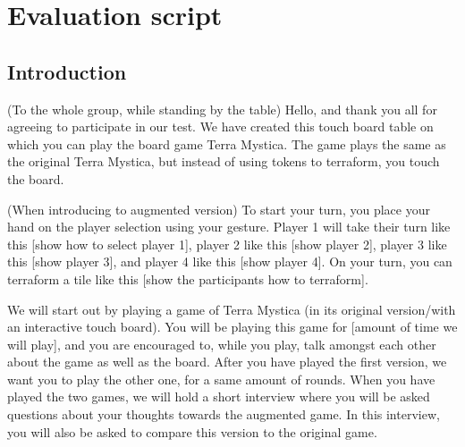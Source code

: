 \chapter{Evaluation script}\label{ch:TestScript}
\section{Introduction}
(To the whole group, while standing by the table)
Hello, and thank you all for agreeing to participate in our test. We have created this touch board table on which you can play the board game Terra Mystica. The game plays the same as the original Terra Mystica, but instead of using tokens to terraform, you touch the board.

(When introducing to augmented version)
To start your turn, you place your hand on the player selection using your gesture. Player 1 will take their turn like this [show how to select player 1], player 2 like this [show player 2], player 3 like this [show player 3], and player 4 like this [show player 4]. On your turn, you can terraform a tile like this [show the participants how to terraform].

We will start out by playing a game of Terra Mystica (in its original version/with an interactive touch board). You will be playing this game for [amount of time we will play], and you are encouraged to, while you play, talk amongst each other about the game as well as the board. After you have played the first version, we want you to play the other one, for a same amount of rounds. When you have played the two games, we will hold a short interview where you will be asked questions about your thoughts towards the augmented game. In this interview, you will also be asked to compare this version to the original game.

